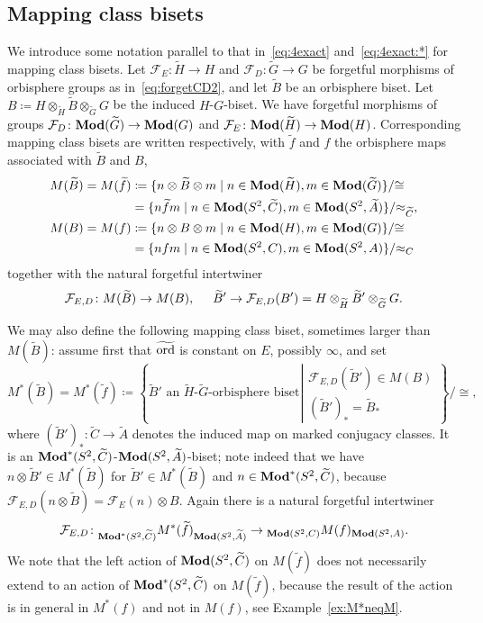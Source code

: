 \documentclass{amsart}
\newcommand\Forget{{\mathcal F}}
\newcommand\wtf{{\widetilde f}}
\newcommand\wtA{{\widetilde A}}
\newcommand\wtB{{\widetilde B}}
\newcommand\wtC{{\widetilde C}}
\newcommand\wtG{{\widetilde G}}
\newcommand\wtH{{\widetilde H}}
\newcommand\wtord{{\widetilde\ord}}
\begin{document}
\subsection{Mapping class bisets}
\label{ss:MapClassBis}
We introduce some notation parallel to that in~\eqref{eq:4exact}
and~\eqref{eq:4exact:*} for mapping class bisets.  Let
$\Forget_E\colon\wtH\to H$ and $\Forget_D\colon\wtG\to G$ be forgetful
morphisms of orbisphere groups as in~\eqref{eq:forgetCD2}, and let
$\wtB$ be an orbisphere biset. Let
$B\coloneqq H\otimes_\wtH\wtB\otimes_\wtG G$ be the induced
$H$-$G$-biset. We have forgetful morphisms of groups
$\Forget_D\colon \Mod(\wtG)\to\Mod(G)$ and
$\Forget_E\colon \Mod(\wtH)\to\Mod(H)$. Corresponding mapping class
bisets are written respectively, with $\wtf$ and $f$ the orbisphere
maps associated with $\wtB$ and $B$,
\begin{align*}
  M(\wtB)=M(\wtf)&\coloneq \{n\otimes\wtB\otimes m\mid
                   n\in\Mod(\wtH),m\in\Mod(\wtG)\}/{\cong}\\
                   &=\{n  \wtf m\mid
                   n\in\Mod(S^2,\wtC),m\in\Mod(S^2,\wtA)\}/{\approx_{\wtC}},\\
  M(B)=M( f)&\coloneq\{n\otimes B\otimes m\mid  n\in\Mod(H),m\in\Mod(G)\}/{\cong}\\
  &=\{n f m\mid  n\in\Mod(S^2,C),m\in\Mod(S^2,A)\}/{\approx_C}
\end{align*}
together with the natural forgetful intertwiner
\begin{equation}\label{eq:dfn:ForgetE,D}
  \Forget_{E,D} \colon  M(\wtB) \to M( B),\hspace{0.5cm} \wtB'\to\Forget_{E,D}(B')=H\otimes_{\wtH}\wtB'\otimes_{\wtG}G.
\end{equation}

We may also define the following mapping class biset, sometimes larger
than $M(\wtB)$: assume first that $\wtord$ is constant on $E$,
possibly $\infty$, and set
\begin{equation}\label{eq:def M*}
  M^*(\wtB)=M^*(\wtf)\coloneqq\left\{\wtB'\text{ an $\wtH$-$\wtG$-orbisphere biset}\left|\begin{array}{c} \Forget_{E,D}(\wtB')\in M(B)\\ (\wtB')_*=\wtB_*\end{array}\right.\right\}/{\cong},
\end{equation}
where $(\wtB')_*\colon \wtC\to \wtA$ denotes the induced map on marked conjugacy classes.
It is an $\Mod^*(S^2,\wtC)$-$\Mod(S^2,\wtA)$-biset; note indeed that
we have $n \otimes \wtB'\in M^*(\wtB)$ for $\wtB'\in M^*(\wtB)$ and
$n\in\Mod^*(S^2,\wtC)$, because
$\Forget_{E,D}(n\otimes\wtB)=\Forget_E(n)\otimes B$. Again there is a
natural forgetful intertwiner
\begin{equation}\label{eq:dfn:ForgetE,D:*}
  \Forget_{E,D} \colon  \subscript{\Mod^*(S^2,\wtC)} M^*(\wtf)_{\Mod(S^2,\wtA)} \to\subscript{\Mod(S^2,C)}M(f)_{\Mod(S^2,A)}.
\end{equation}
We note that the left action of $\Mod(S^2,\wtC)$ on $M(\wtf)$
does not necessarily extend to an action of $\Mod^*(S^2,\wtC)$ on
$M(\wtf)$, because the result of the action is in general in $M^*(f)$
and not in $M(f)$, see Example~\ref{ex:M*neqM}.
\end{document}
